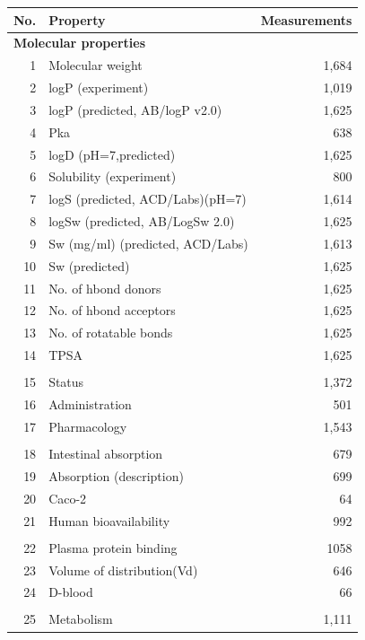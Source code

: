 \begin{table}
\centering
\begin{tabular*}
{\linewidth}
{@{\extracolsep{\fill}}rlr}
\toprule
No. & Property & Measurements \\
\midrule
\multicolumn{3}{l}{\textbf{Molecular properties}}\\
1 & Molecular weight & 1,684 \\
2 & logP (experiment) & 1,019 \\
3 & logP (predicted, AB/logP v2.0) & 1,625 \\
4 & Pka & 638 \\
5 & logD (pH=7,predicted) & 1,625 \\
6 & Solubility (experiment) & 800 \\
7 & logS (predicted, ACD/Labs)(pH=7) & 1,614 \\
8 & logSw (predicted, AB/LogSw 2.0) & 1,625 \\
9 & Sw (mg/ml) (predicted, ACD/Labs) & 1,613 \\
10 & Sw (predicted) & 1,625 \\
11 & No. of hbond donors & 1,625 \\
12 & No. of hbond acceptors & 1,625 \\
13 & No. of rotatable bonds & 1,625 \\
14 & TPSA & 1,625 \\
\noalign{\smallskip\smallskip}
\multicolumn{3}{l}{\textbf{Pharmacology}}\\
15 & Status & 1,372 \\
16 & Administration & 501 \\
17 & Pharmacology & 1,543 \\
\noalign{\smallskip\smallskip}
\multicolumn{3}{l}{\textbf{Absorption}}\\
18 & Intestinal absorption & 679 \\
19 & Absorption (description) & 699 \\
20 & Caco-2 & 64 \\
21 & Human bioavailability & 992 \\
\noalign{\smallskip\smallskip}
\multicolumn{3}{l}{\textbf{Distribution}}\\
22 & Plasma protein binding & 1058 \\
23 & Volume of distribution(Vd) & 646 \\
24 & D-blood & 66 \\
\noalign{\smallskip\smallskip}
\multicolumn{3}{l}{\textbf{Metabolism}}\\
25 & Metabolism & 1,111 \\

\end{tabular*}
\end{table}
